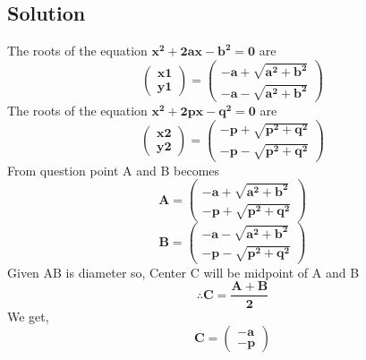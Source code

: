 \documentclass[journal,12pt,twocolumn]{IEEEtran}
\let\vec\mathbf
\begin{document}
\begin{tableofcontents}
\section{Solution}
The roots of the equation $\vec{x^2+2ax-b^2=0}$ are \\
\begin{equation}
\begin{pmatrix}
\vec{x1} \\
\vec{y1}
\end{pmatrix}
=
\begin{pmatrix}
\vec{-a+\sqrt{a^2+b^2}}\\
\vec{-a-\sqrt{a^2+b^2}}
\end{pmatrix}
\end{equation}
The roots of the equation $\vec{x^2+2px-q^2=0}$ are \\
\begin{equation}
\begin{pmatrix}
\vec{x2} \\
\vec{y2}
\end{pmatrix}
=
\begin{pmatrix}
\vec{-p+\sqrt{p^2+q^2}}\\
\vec{-p-\sqrt{p^2+q^2}}
\end{pmatrix}
\end{equation}
From question point A and B becomes\\
\begin{equation}
\vec{A}
=
\begin{pmatrix}
\vec{-a+\sqrt{a^2+b^2}}\\
\vec{-p+\sqrt{p^2+q^2}}
\end{pmatrix}
\end{equation}
\begin{equation}
\vec{B}
=
\begin{pmatrix}
\vec{-a-\sqrt{a^2+b^2}}\\
\vec{-p-\sqrt{p^2+q^2}}
\end{pmatrix}
\end{equation}
Given AB is diameter so, Center C will be midpoint of A and B\\ 
\begin{equation}
\therefore \vec{C=\frac{A+B}{2}}
\end{equation}
We get,
\begin{equation}
\vec{C}
=
\begin{pmatrix}
\vec{-a}\\
\vec{-p}
\end{pmatrix}
\end{equation}

\end{tableofcontents}
\end{document}

